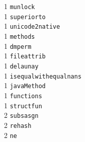 \begin{footnotesize}
\begin{multicols}{3}
\vspace{-.153cm} 1     \hspace{.2cm} {\tt munlock             }   \\ %
\vspace{-.153cm} 1     \hspace{.2cm} {\tt superiorto          }   \\ %
\vspace{-.153cm} 1     \hspace{.2cm} {\tt unicode2native      }   \\ %
\vspace{-.153cm} 1     \hspace{.2cm} {\tt methods             }   \\ %
\vspace{-.153cm} 1     \hspace{.2cm} {\tt dmperm              }   \\ %
\vspace{-.153cm} 1     \hspace{.2cm} {\tt fileattrib          }   \\ %
\vspace{-.153cm} 1     \hspace{.2cm} {\tt delaunay            }   \\ %
\vspace{-.153cm} 1     \hspace{.2cm} {\tt isequalwithequalnans}   \\ %
\vspace{-.153cm} 1     \hspace{.2cm} {\tt javaMethod          }   \\ %
\vspace{-.153cm} 1     \hspace{.2cm} {\tt functions           }   \\ %
\vspace{-.153cm} 1     \hspace{.2cm} {\tt structfun           }   \\ %
\vspace{-.153cm} 2     \hspace{.2cm} {\tt subsasgn            }   \\ %
\vspace{-.153cm} 2     \hspace{.2cm} {\tt rehash              }   \\ %
\vspace{-.153cm} 2     \hspace{.2cm} {\tt ne                  }   \\ %

\end{multicols}
\end{footnotesize}
